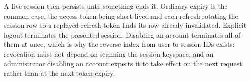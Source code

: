 A live session then persists until something ends it. Ordinary expiry is the common case, the access token being short-lived and each refresh rotating the session row so a replayed refresh token finds its row already invalidated. Explicit logout terminates the presented session. Disabling an account terminates all of them at once, which is why the reverse index from user to session IDs exists: revocation must not depend on scanning the session keyspace, and an administrator disabling an account expects it to take effect on the next request rather than at the next token expiry.
